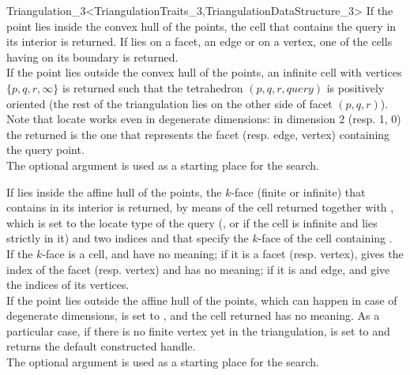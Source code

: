\begin{ccRefClass}{Triangulation_3<TriangulationTraits_3,TriangulationDataStructure_3>}
{
If the point  lies inside the convex hull of the points, the cell 
that contains the query in its interior is returned. If  lies on a
facet, an edge or on a vertex, one of the cells having  on
its boundary is returned.\\ 
If the point  lies outside the convex hull of the points,
an infinite cell with vertices $\{ p, q, r, \infty\}$ is returned such that
the tetrahedron $( p, q, r, query )$ is positively oriented
(the rest of the triangulation lies on the other side of facet 
$( p, q, r )$). \\
Note that locate works even in degenerate dimensions: in dimension 2
(resp. 1, 0) the  returned is the one that represents
the facet (resp. edge, vertex) containing the query point. \\
The optional argument  is used as a starting place for the search.
}

{If  lies inside the affine hull of the points, the $k$-face
(finite or infinite) that contains  in its interior is
returned, by means of the cell returned together with , which
is set to the locate type of the query (, or  if the cell is infinite and 
lies strictly in it) and two indices  and  that
specify the $k$-face of the cell containing .\\ 
If the $k$-face is a cell,  and  have no
meaning; if it is a facet (resp. vertex),  gives the index of
the facet (resp. vertex) and  has no meaning; if it is and
edge,  and  give the indices of its vertices.\\ 
If the point  lies outside the affine hull of the points,
which can happen in case of degenerate dimensions,  is set to
, and the cell returned has no meaning.
As a particular case, if there is no finite vertex yet in the
triangulation,  is set to  and
 returns the default constructed handle. \\
The optional argument  is used as a starting place for the search.
}


\end{ccRefClass}
